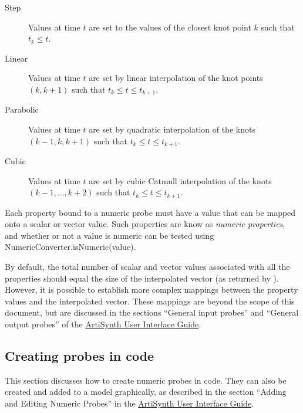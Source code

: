 \begin{description}

\item[Step]\mbox{}

Values at time $t$ are set to the values of the closest knot point
$k$ such that $t_k \le t$.

\item[Linear]\mbox{}

Values at time $t$ are set by linear interpolation of the knot points
$(k, k+1)$ such that $t_k \le t \le t_{k+1}$.

\item[Parabolic]\mbox{}

Values at time $t$ are set by quadratic interpolation of the knots
$(k-1, k, k+1)$ such that $t_k \le t \le t_{k+1}$.

\item[Cubic]\mbox{}

Values at time $t$ are set by cubic Catmull interpolation of the knots
$(k-1, \ldots, k+2)$ such that $t_k \le t \le t_{k+1}$.

\end{description}

Each property bound to a numeric probe must have a value
that can be mapped onto a scalar or vector value. Such properties
are know as {\it numeric properties}, and whether or not
a value is numeric can be tested
using %
{NumericConverter.isNumeric(value)}.

By default, the total number of scalar and vector values associated
with all the properties should equal the size of the interpolated
vector (as returned by
).
However, it is possible to establish more complex mappings between the
property values and the interpolated vector. These mappings are beyond
the scope of this document, but are discussed in the sections ``General
input probes'' and ``General output probes'' of the
\href{\artisynthDocBase/html/uiguide/uiguide.html}{
ArtiSynth User Interface Guide}.

\subsection{Creating probes in code}

This section discusses how to create numeric probes in code.  They can
also be created and added to a model graphically, as described in the
section ``Adding and Editing Numeric Probes'' in the
\href{\artisynthDocBase/html/uiguide/uiguide.html}{
ArtiSynth User Interface Guide}.

